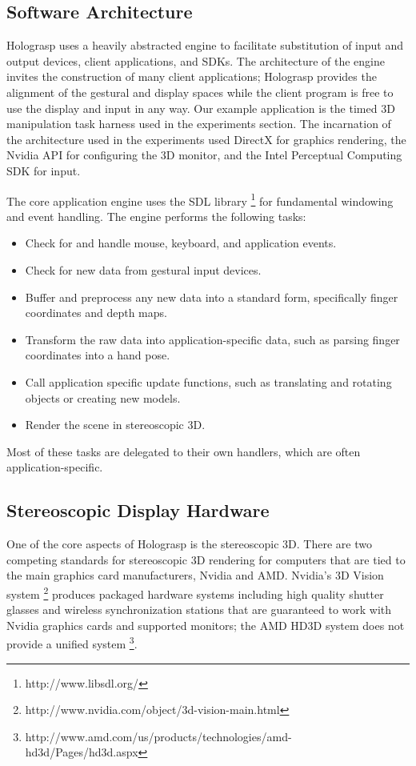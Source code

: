 \documentclass[pageno]{jpaper}
\begin{document}
\subsection{Software Architecture}
Holograsp uses a heavily abstracted engine to facilitate substitution of input and output devices, client applications, and SDKs.
The architecture of the engine invites the construction of many client applications; Holograsp provides the alignment of the
gestural and display spaces while the client program is free to use the display and input in any way. Our example application
is the timed 3D manipulation task harness used in the experiments section. The incarnation of the architecture used in the
experiments used DirectX for graphics rendering, the Nvidia API for configuring the 3D monitor, and the Intel Perceptual
Computing SDK for input.

The core application engine uses the SDL library \footnote{http://www.libsdl.org/} for fundamental windowing and event handling.
The engine performs the following tasks:
\begin{itemize}
\item Check for and handle mouse, keyboard, and application events.
\item Check for new data from gestural input devices.
\item Buffer and preprocess any new data into a standard form, specifically finger coordinates and depth maps.
\item Transform the raw data into application-specific data, such as parsing finger coordinates into a hand pose.
\item Call application specific update functions, such as translating and rotating objects or creating new models.
\item Render the scene in stereoscopic 3D.
\end{itemize}

Most of these tasks are delegated to their own handlers, which are often application-specific.

\subsection{Stereoscopic Display Hardware}
One of the core aspects of Holograsp is the stereoscopic 3D. There are two competing standards for stereoscopic 3D rendering for computers
that are tied to the main graphics card manufacturers, Nvidia and AMD. Nvidia's 3D Vision system \footnote{http://www.nvidia.com/object/3d-vision-main.html}
produces packaged hardware systems including high quality shutter glasses and wireless synchronization stations that are guaranteed to work with Nvidia
graphics cards and supported monitors; the AMD HD3D system does not provide a unified system \footnote{http://www.amd.com/us/products/technologies/amd-hd3d/Pages/hd3d.aspx}.
\end{document}
